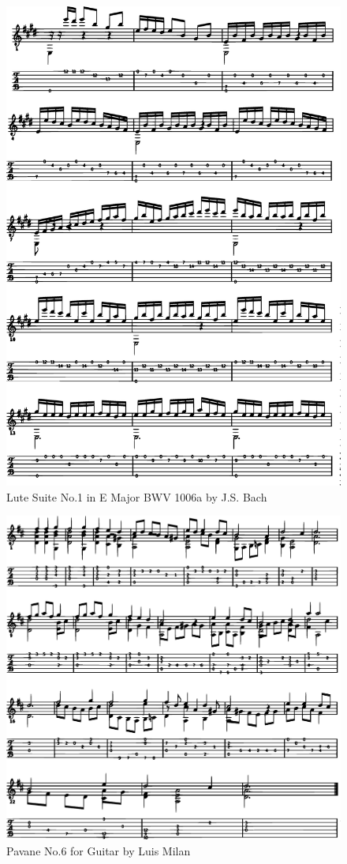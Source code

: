 \begin{figure}[h]
    \centering
    \includegraphics[width=1.0\textwidth]{Figures/Lut.eps}
    \caption{Lute Suite No.1 in E Major BWV 1006a by J.S. Bach}
    \label{fig:result-lut}
\end{figure}

\begin{figure}[h]
    \centering
    \includegraphics[width=1.0\textwidth]{Figures/Pav.eps}
    \caption{Pavane No.6 for Guitar by Luis Milan}
    \label{fig:result-pav}
\end{figure}
